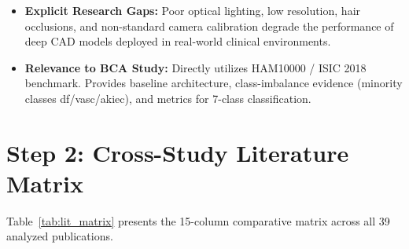 \documentclass[11pt,a4paper]{article}
\begin{document}
\begin{itemize}
\item \textbf{Explicit Research Gaps:} Poor optical lighting, low resolution, hair occlusions, and non-standard camera calibration degrade the performance of deep CAD models deployed in real-world clinical environments.
\item \textbf{Relevance to BCA Study:} Directly utilizes HAM10000 / ISIC 2018 benchmark. Provides baseline architecture, class-imbalance evidence (minority classes df/vasc/akiec), and metrics for 7-class classification.
\end{itemize}

\newpage
\section{Step 2: Cross-Study Literature Matrix}
Table~\ref{tab:lit_matrix} presents the 15-column comparative matrix across all 39 analyzed publications.
\end{document}
